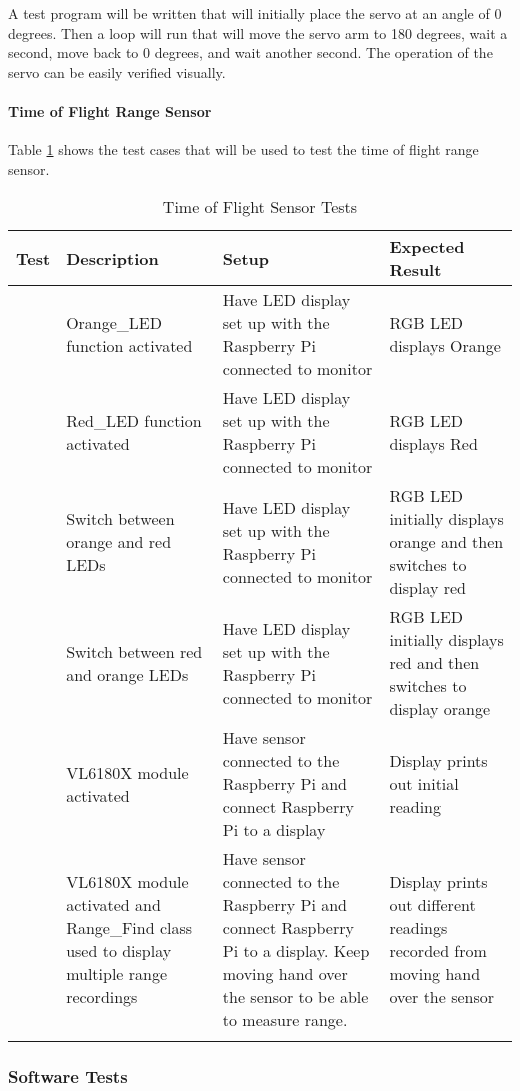 A test program will be written that will initially place the servo at an angle
of 0 degrees.  Then a loop will run that will move the servo arm to 180 degrees,
wait a second, move back to 0 degrees, and wait another second.  The operation
of the servo can be easily verified visually.

\paragraph{Time of Flight Range Sensor}

Table \ref{table:tof-tests} shows the test cases that will be used to test the
time of flight range sensor.

\begin{longtable}[htb]{>{\centering\arraybackslash}m{0.75cm}|>{\centering\arraybackslash}m{4cm}|>{\centering\arraybackslash}m{4.5cm}|>{\centering\arraybackslash}m{4cm}}
\toprule
Test & Description & Setup & Expected Result \\
\midrule
1 & Orange\_LED function activated & Have LED display set up with the Raspberry
Pi connected to monitor & RGB LED displays Orange \\
\hline
2 & Red\_LED function activated & Have LED display set up with the Raspberry Pi
connected to monitor & RGB LED displays Red \\
\hline
3 & Switch between orange and red LEDs & Have LED display set up with the
Raspberry Pi connected to monitor & RGB LED initially displays orange and then
switches to display red \\
\hline
4 & Switch between red and orange LEDs & Have LED display set up with the
Raspberry Pi connected to monitor & RGB LED initially displays red and then
switches to display orange \\
\hline
5 & VL6180X module activated & Have sensor connected to the Raspberry Pi and
connect Raspberry Pi to a display & Display prints out initial reading \\
\hline
6 & VL6180X module activated and Range\_Find class used to display multiple
range recordings & Have sensor connected to the Raspberry Pi and connect
Raspberry Pi to a display. Keep moving hand over the sensor to be able to
measure range. & Display prints out different readings recorded from moving
hand over the sensor \\
\bottomrule
\caption{Time of Flight Sensor Tests}
\label{table:tof-tests}
\end{longtable}

\subsubsection{Software Tests}

